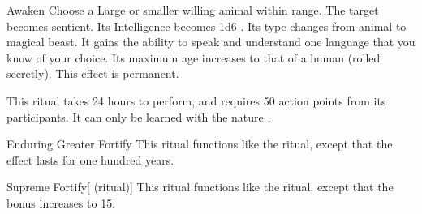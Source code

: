 \lowercase{\hypertarget{spell:Awaken}{}}\label{spell:Awaken}
\begin{freeability}[\nth{5}]{\hypertarget{spell:Awaken}{Awaken}}
Choose a Large or smaller willing animal within \rngclose range.
The target becomes sentient.
Its Intelligence becomes 1d6 .
Its type changes from animal to magical beast.
It gains the ability to speak and understand one language that you know of your choice.
Its maximum age increases to that of a human (rolled secretly).
This effect is permanent.

This ritual takes 24 hours to perform, and requires 50 action points from its participants.
It can only be learned with the nature .
\end{freeability}
\vspace{0.25em}



\lowercase{\hypertarget{spell:Enduring Greater Fortify}{}}\label{spell:Enduring Greater Fortify}
\begin{freeability}[\nth{5}]{\hypertarget{spell:Enduring Greater Fortify}{Enduring Greater Fortify}}
This ritual functions like the  ritual, except that the effect lasts for one hundred years.
\end{freeability}
\vspace{0.25em}



\lowercase{\hypertarget{spell:Supreme Fortify}{}}\label{spell:Supreme Fortify}
\begin{attuneability}[\nth{6}]{\hypertarget{spell:Supreme Fortify}{Supreme Fortify}}[ (ritual)]
This ritual functions like the  ritual, except that the  bonus increases to 15.
\end{attuneability}
\vspace{0.25em}


